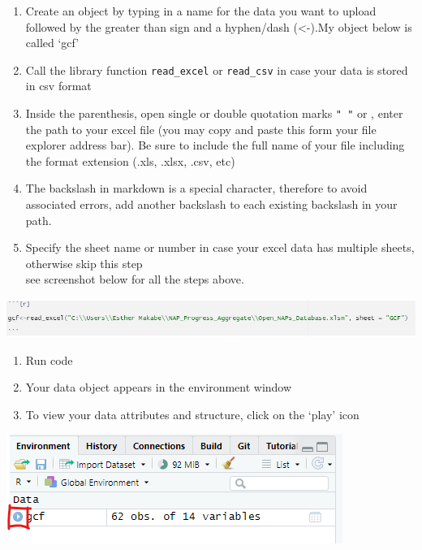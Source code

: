 \documentclass[
]{book}
\providecommand{\tightlist}{%
  \setlength{\itemsep}{0pt}\setlength{\parskip}{0pt}}
\let\origfigure\figure
\let\endorigfigure\endfigure
\renewenvironment{figure}[1][2] {
    \expandafter\origfigure\expandafter[H]
} {
    \endorigfigure
}
\begin{document}
\begin{enumerate}
\def\labelenumi{\arabic{enumi}.}
\tightlist
\item
  Create an object by typing in a name for the data you want to upload followed by the greater than sign and a hyphen/dash (\textless-).My object below is called `gcf'
\item
  Call the library function \texttt{read\_excel} or \texttt{read\_csv} in case your data is stored in csv format\\
\item
  Inside the parenthesis, open single or double quotation marks \texttt{"\ "} or \texttt{\textquotesingle{}\textquotesingle{}} , enter the path to your excel file (you may copy and paste this form your file explorer address bar). Be sure to include the full name of your file including the format extension (.xls, .xlsx, .csv, etc)\\
\item
  The backslash in markdown is a special character, therefore to avoid associated errors, add another backslash to each existing backslash in your path.\\
\item
  Specify the sheet name or number in case your excel data has multiple sheets, otherwise skip this step\\
  see screenshot below for all the steps above.
\end{enumerate}

\begin{figure}
\centering
\includegraphics{tutorial_screenshots/load_excel.png}
\caption{exceldata}
\end{figure}

\begin{enumerate}
\def\labelenumi{\arabic{enumi}.}
\setcounter{enumi}{5}
\tightlist
\item
  Run code\\
\item
  Your data object appears in the environment window\\
\item
  To view your data attributes and structure, click on the `play' icon
\end{enumerate}

\begin{figure}
\centering
\includegraphics{tutorial_screenshots/view_exel_attr.png}
\caption{view attr}
\end{figure}
\end{document}
